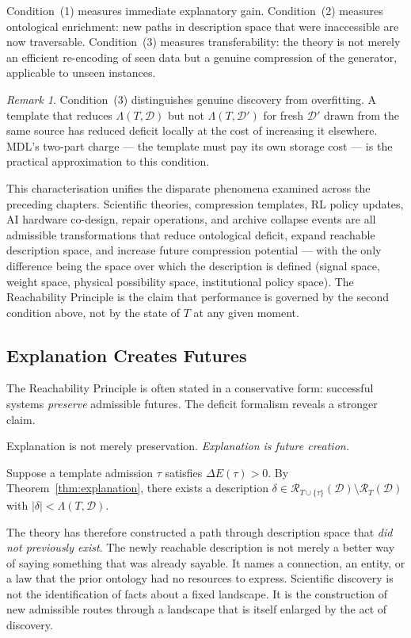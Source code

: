 \documentclass[11pt, a4paper, openany]{book}
\theoremstyle{plain}
\theoremstyle{definition}
\theoremstyle{remark}
\newtheorem{remark}[theorem]{Remark}
\begin{document}
Condition~(1) measures immediate explanatory gain.
Condition~(2) measures ontological enrichment: new paths in description space
that were inaccessible are now traversable.
Condition~(3) measures transferability: the theory is not merely an
efficient re-encoding of seen data but a genuine compression of
the generator, applicable to unseen instances.

\begin{remark}
  Condition~(3) distinguishes genuine discovery from overfitting.
  A template that reduces $\Lambda(T, \mathcal{D})$ but not
  $\Lambda(T, \mathcal{D}')$ for fresh $\mathcal{D}'$ drawn from the
  same source has reduced deficit locally at the cost of increasing it
  elsewhere.
  MDL's two-part charge --- the template must pay its own storage cost ---
  is the practical approximation to this condition.
\end{remark}

This characterisation unifies the disparate phenomena examined across the
preceding chapters.
Scientific theories, compression templates, RL policy updates, AI hardware
co-design, repair operations, and archive collapse events are all admissible
transformations that reduce ontological deficit, expand reachable description
space, and increase future compression potential --- with the only difference
being the space over which the description is defined (signal space,
weight space, physical possibility space, institutional policy space).
The Reachability Principle is the claim that performance is governed by the
second condition above, not by the state of $T$ at any given moment.

\subsection{Explanation Creates Futures}

The Reachability Principle is often stated in a conservative form:
successful systems \emph{preserve} admissible futures.
The deficit formalism reveals a stronger claim.

Explanation is not merely preservation.
\emph{Explanation is future creation.}

Suppose a template admission $\tau$ satisfies $\Delta E(\tau) > 0$.
By Theorem~\ref{thm:explanation}, there exists a description
$\delta \in \mathcal{R}_{T \cup \{\tau\}}(\mathcal{D}) \setminus \mathcal{R}_T(\mathcal{D})$
with $|\delta| < \Lambda(T, \mathcal{D})$.

The theory has therefore constructed a path through description space that
\emph{did not previously exist}.
The newly reachable description is not merely a better way of saying something
that was already sayable.
It names a connection, an entity, or a law that the prior ontology had no
resources to express.
Scientific discovery is not the identification of facts about a fixed landscape.
It is the construction of new admissible routes through a landscape that
is itself enlarged by the act of discovery.
\end{document}
